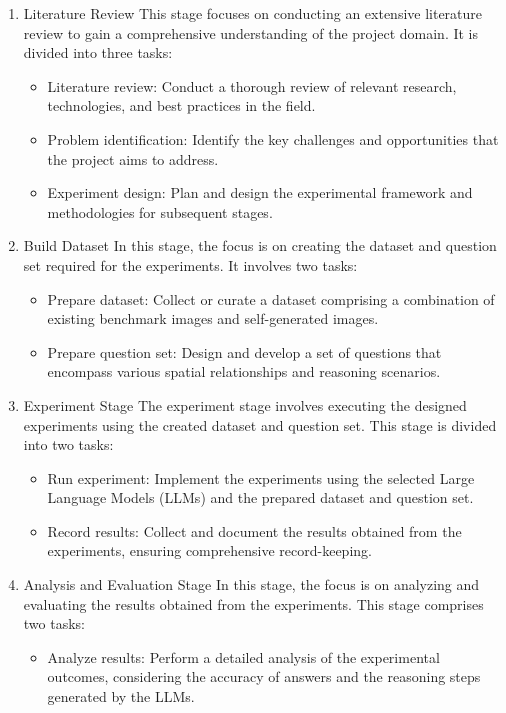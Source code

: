 \documentclass[journal,10pt]{IEEEtran}
\begin{document}
\begin{enumerate}
    \item Literature Review
    \subitem This stage focuses on conducting an extensive literature review to gain a comprehensive understanding of the project domain. It is divided into three tasks:
    \begin{itemize}
        \item Literature review: Conduct a thorough review of relevant research, technologies, and best practices in the field.
        \item Problem identification: Identify the key challenges and opportunities that the project aims to address.
        \item Experiment design: Plan and design the experimental framework and methodologies for subsequent stages.
    \end{itemize}
    \item Build Dataset
    \subitem In this stage, the focus is on creating the dataset and question set required for the experiments. It involves two tasks:
    \begin{itemize}
        \item Prepare dataset: Collect or curate a dataset comprising a combination of existing benchmark images and self-generated images.
        \item Prepare question set: Design and develop a set of questions that encompass various spatial relationships and reasoning scenarios.
    \end{itemize}
    \item Experiment Stage
    \subitem The experiment stage involves executing the designed experiments using the created dataset and question set. This stage is divided into two tasks:
    \begin{itemize}
        \item Run experiment: Implement the experiments using the selected Large Language Models (LLMs) and the prepared dataset and question set.
        \item Record results: Collect and document the results obtained from the experiments, ensuring comprehensive record-keeping.
    \end{itemize}
    \item Analysis and Evaluation Stage
    \subitem In this stage, the focus is on analyzing and evaluating the results obtained from the experiments. This stage comprises two tasks:
    \begin{itemize}
        \item Analyze results: Perform a detailed analysis of the experimental outcomes, considering the accuracy of answers and the reasoning steps generated by the LLMs.

\end{itemize}
\end{enumerate}
\end{document}
